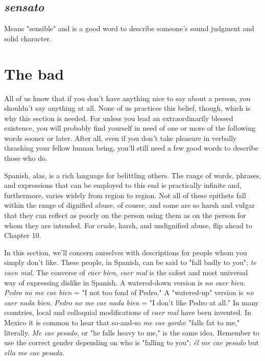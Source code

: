 \documentclass[14pt,a4paper,oneside]{memoir}
\begin{document}
\subsection{\emph{sensato}}

Means "sensible" and is a good word to describe
someone's sound judgment and solid character.

\section{The bad}

All of us know that if you don't have anything nice to say
about a person, you shouldn't say anything at all. None of us practices
this belief, though, which is why this section is needed. For unless you
lead an extraordinarily blessed existence, you will probably find yourself in need of one or more of the following words sooner or later. After
all, even if you don't take pleasure in verbally thrashing your fellow
human being, you'll still need a few good words to describe those
who do.

Spanish, alas, is a rich language for belittling others. The range
of words, phrases, and expressions that can be employed to this end is
practically infinite and, furthermore, varies widely from region to region. Not all of these epithets fall within the range of dignified abuse,
of course, and some are so harsh and vulgar that they can reflect as
poorly on the person using them as on the person for whom they are
intended. For crude, harsh, and undignified abuse, flip ahead to
Chapter 10.

In this section, we'll concern ourselves with descriptions for
people whom you simply don't like. These people, in Spanish, can be
said to "fall badly to you"; \emph{te caen mal}. The converse of \emph{caer bien},
\emph{caer mal} is the safest and most universal way of expressing dislike in
Spanish. A watered-down version is \emph{no caer bien}. \emph{Pedro no me cae
bien} = "I not too fond of Pedro." A "watered-up" version is \emph{no caer
nada bien}. \emph{Pedro no me cae nada bien} = "I don't like Pedro at all." In
many countries, local and colloquial modifications of \emph{caer mal} have
been invented. In Mexico it is common to hear that so-and-so \emph{me cae
gordo}: "falls fat to me," literally. \emph{Me cae pesado}, or "he falls heavy to
me," is the same idea. Remember to use the correct gender depending
on who is "falling to you": \emph{él me cae pesado} but \emph{ella me cae pesada}.
\end{document}
